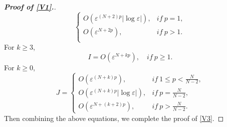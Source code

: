 \documentclass[10pt,a4paper]{amsart}
\newcommand\e\varepsilon
\begin{document}
\begin{proof}[\bf Proof of \eqref{V1}.]
\begin{equation}
\begin{cases}
						O(\e^{(N+2)p}|\log\e|), &if\  p=1,\\
						O(\e^{N+2p}),   &if\  p>1.\\
					\end{cases}
				\end{equation}
				For $k\ge 3$,
				\begin{equation}
					I=	O(\e^{N+kp}),\quad if \ p\ge 1.
				\end{equation}
                For $k\ge 0$, 
				\begin{equation}
					J=
					\begin{cases}
						O(\e^{(N+k)p}),&if\ 1\le p<\frac N{N-2},\\
						O(\e^{(N+k)p}|\log\e|),&if\  p=\frac N{N-2},\\
						O(\e^{N+(k+2)p}),&if\ p>\frac N{N-2}.
					\end{cases}
				\end{equation}
                Then combining the above equations, we complete the proof of  \eqref{V3}.
				\end{proof} 	   	 
\end{document}
